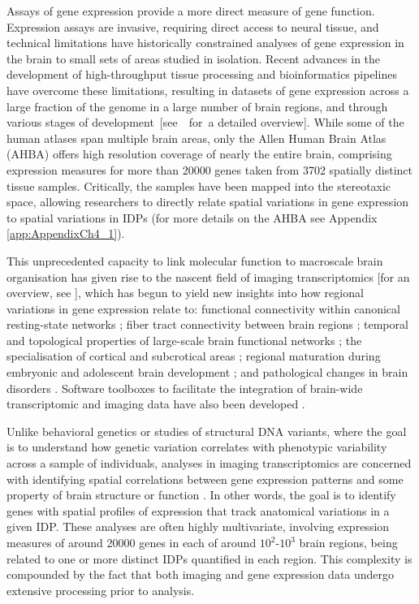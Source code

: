 Assays of gene expression provide a more direct measure of gene function. Expression assays are invasive, requiring direct access to neural tissue, and technical limitations have historically constrained analyses of gene expression in the brain to small sets of areas studied in isolation. Recent advances in the development of high-throughput tissue processing and bioinformatics pipelines have overcome these limitations, resulting in datasets of gene expression across a large fraction of the genome in a large number of brain regions, and through various stages of \mbox{development [see \citet{Keil2018} for }a detailed overview]. While some of the human atlases span multiple brain areas, only the Allen Human Brain Atlas (AHBA) offers high resolution coverage of nearly the entire brain, comprising expression measures for more than \num{20000} genes taken from \num{3702} spatially distinct tissue samples. Critically, the samples have been mapped into the stereotaxic space, allowing researchers to directly relate spatial variations in gene expression to spatial variations in IDPs (for more details on the AHBA see Appendix \ref{app:AppendixCh4_1}).

This unprecedented capacity to link molecular function to macroscale brain organisation has given rise to the nascent field of imaging transcriptomics [for an overview, see \citep{Fornito2019}], which has begun to yield new insights into how regional variations in gene expression relate to: functional connectivity within canonical resting-state networks \mbox{\citep{Richiardi2015,Forest2017}};
fiber tract connectivity between brain regions \citep{Goel2014};
temporal and topological properties of large-scale brain functional networks \citep{Cioli2014b,Vertes2016b};
the specialisation of cortical and subcrotical areas \citep{Krienen2016,Parkes2017,Anderson2018};
regional maturation during embryonic and adolescent brain development \citep{Kirsch2016a,Whitaker2016a};
and pathological changes in brain disorders \citep{Rittman2016,Romme2017,McColgan2018,Romero-Garcia2018a}. Software toolboxes to facilitate the integration of brain-wide transcriptomic and imaging data have also been developed \citep{French2015,Gorgolewski2015,Rizzo2016,Rittman2017}.

Unlike behavioral genetics or studies of structural DNA variants, where the goal is to understand how genetic variation correlates with phenotypic variability across a sample of individuals, analyses in imaging transcriptomics are concerned with identifying spatial correlations between gene expression patterns and some property of brain structure or function \citep{Fornito2019}. In other words, the goal is to identify genes with spatial profiles of expression that track anatomical variations in a given IDP. These analyses are often highly multivariate, involving expression measures of around \num{20000} genes in each of around $10^{2}$-$10^{3}$ brain regions, being related to one or more distinct IDPs quantified in each region. This complexity is compounded by the fact that both imaging and gene expression data undergo extensive processing prior to analysis.

